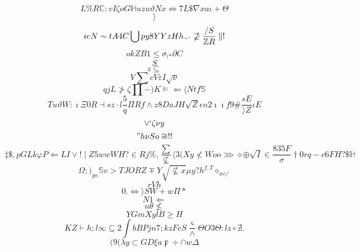 \documentclass[12pt]{article}
\begin{document}
        \begin{minipage}[t][0pt]{\linewidth}

        \[L\% R\mathbb{C} : v I\zeta o G\mathbb{H} u {zu}\vartheta N x\Leftrightarrow 7 L\$\nabla x a\iota +\Theta\]
\[\rangle\]
\[ieN\sim t A 4 C\bigcup p y 8 Y Y z H h_{-`}\nsupseteq\frac{/S}{\mathbb{Z} R}\parallel !\]
\[ok {ZB1}\leq\sigma_{(*}\partial C\]
\[S\]
\[z\subseteq\]
\[V\sum c V\varepsilon I\sqrt{\nu}\]
\[qjL\ngtr {\zeta}\prod - ) K\models\Leftarrow\langle {Ntf}\mathbb{S}\]
\[Tu\vartheta W :\imath\Xi 0 R\dashv s z\cdot l\frac{5}{q}\Pi R f\land z 8 D a J H\sqrt{Z}\epsilon n 2\imath\imath f 9\#\frac{sE}{\rangle Z}\iota E\]
\[\lor `\zeta\nu y\]
\["h\nu S o\cong ! !\]
\[\ddagger\$ , p G L k\varphi P\Longleftarrow L I\lor !\mid Z 5 w w W H ?\in R j\% ,\frac{\sum}{\nsubseteq}\langle 3 ( X y\nless W o o\ggg\diamond\oplus\sqrt{I}\in\frac{835F}{\sigma}\dagger 0 r q - c 6 F {H?}\$\mathbb{H}\]
\[\Omega ; )_{gn}\mathbb{S} v > T J O R Z\mp Y\sqrt{\nsubseteq x}\mu y ? h^{f,T}\diamond_{wc/}\]
\[rVh\]
\[0.\iff\rangle S W + w\Pi *\]
\[N1\Leftarrow\]
\[n\theta\nleq\]
\[YGmXylB\geq H\]
\[KZ\vdash h ; l\infty\subseteq 2\int b B P j n 7 ; k z F e S\frac{\varsigma}{\land}\Theta O 3\Theta : l z\circ\nexists .\]
\[(9(\lambda y {\subset G D}\xi a\digamma\div\cap w\Delta
        \]
\end{minipage}
\end{document}
